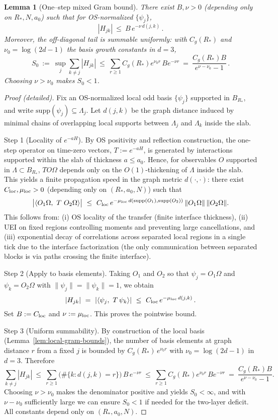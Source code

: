 \documentclass[11pt]{amsart}
\theoremstyle{plain}
\newtheorem{lemma}[theorem]{Lemma}
\theoremstyle{definition}
\theoremstyle{remark}
\begin{document}
\begin{lemma}[One--step mixed Gram bound]\label{lem:mixed-gram-bound}
There exist $B,\nu>0$ (depending only on $R_*,N,a_0$) such that for OS-normalized $\{\psi_j\}$,
\[
  |H_{jk}|\ \le\ B\,e^{-\nu\,d(j,k)}\,.
\]
Moreover, the off-diagonal tail is summable uniformly: with $C_g(R_*)$ and $\nu_0=\log(2d-1)$ the basis growth constants in $d=3$,
\[
  S_0\ :=\ \sup_j \sum_{k\ne j} |H_{jk}|\ \le\ \sum_{r\ge 1} C_g(R_*) e^{\nu_0 r}\, B e^{-\nu r}\ =\ \frac{C_g(R_*) B}{e^{\nu-\nu_0}-1}\,.
\]
Choosing $\nu>\nu_0$ makes $S_0<1$.
\end{lemma}
\begin{proof}[Proof (detailed)]
Fix an OS-normalized local odd basis $\{\psi_j\}$ supported in $B_{R_*}$, and write $\mathrm{supp}(\psi_j)\subseteq \Lambda_j$. Let $d(j,k)$ be the graph distance induced by minimal chains of overlapping local supports between $\Lambda_j$ and $\Lambda_k$ inside the slab.

Step 1 (Locality of $e^{-aH}$). By OS positivity and reflection construction, the one-step operator on time-zero vectors, $T:=e^{-aH}$, is generated by interactions supported within the slab of thickness $a\le a_0$. Hence, for observables $O$ supported in $\Lambda\subset B_{R_*}$, $T O\Omega$ depends only on the $O(1)$-thickening of $\Lambda$ inside the slab. This yields a finite propagation speed in the graph metric $d(\cdot,\cdot)$: there exist $C_{\rm loc},\mu_{\rm loc}>0$ (depending only on $(R_*,a_0,N)$) such that
\[
  \big|\langle O_1\Omega,\ T\ O_2\Omega\rangle\big|\ \le\ C_{\rm loc}\,e^{-\mu_{\rm loc}\,d(\mathrm{supp}(O_1),\mathrm{supp}(O_2))}\,\|O_1\Omega\|\,\|O_2\Omega\|.
\]
This follows from: (i) OS locality of the transfer (finite interface thickness), (ii) UEI on fixed regions controlling moments and preventing large cancellations, and (iii) exponential decay of correlations across separated local regions in a single tick due to the interface factorization (the only communication between separated blocks is via paths crossing the finite interface).

Step 2 (Apply to basis elements). Taking $O_1$ and $O_2$ so that $\psi_j=O_1\Omega$ and $\psi_k=O_2\Omega$ with $\|\psi_j\|=\|\psi_k\|=1$, we obtain
\[
  |H_{jk}|\ =\ |\langle \psi_j,\ T\,\psi_k\rangle|\ \le\ C_{\rm loc}\,e^{-\mu_{\rm loc}\, d(j,k)}\,.
\]
Set $B:=C_{\rm loc}$ and $\nu:=\mu_{\rm loc}$. This proves the pointwise bound.

Step 3 (Uniform summability). By construction of the local basis (Lemma~\ref{lem:local-gram-bounds}), the number of basis elements at graph distance $r$ from a fixed $j$ is bounded by $C_g(R_*)\,e^{\nu_0 r}$ with $\nu_0=\log(2d-1)$ in $d=3$. Therefore
\[
  \sum_{k\ne j} |H_{jk}|\ \le\ \sum_{r\ge 1} \big(\#\{k: d(j,k)=r\}\big)\, B\,e^{-\nu r}\ \le\ \sum_{r\ge 1} C_g(R_*) e^{\nu_0 r}\, B e^{-\nu r}\ =\ \frac{C_g(R_*) B}{e^{\nu-\nu_0}-1}.
\]
Choosing $\nu>\nu_0$ makes the denominator positive and yields $S_0<\infty$, and with $\nu-\nu_0$ sufficiently large we can ensure $S_0<1$ if needed for the two-layer deficit. All constants depend only on $(R_*,a_0,N)$.
\end{proof}
\end{document}
